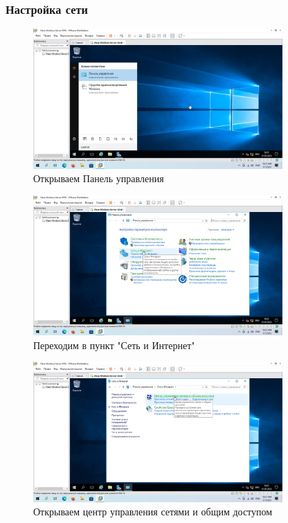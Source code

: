 \documentclass[a4paper]{article}
\begin{document}
  \subsubsection{Настройка сети}

  \begin{figure}[H]
    \centering
    \includegraphics[width=0.85\textwidth]{9_0014}
    \caption{Открываем Панель управления}
    \label{img:0014}
  \end{figure}

  \begin{figure}[H]
    \centering
    \includegraphics[width=0.85\textwidth]{9_0015}
    \caption{Переходим в пункт "Сеть и Интернет"}
    \label{img:0015}
  \end{figure}

  \begin{figure}[H]
    \centering
    \includegraphics[width=0.85\textwidth]{9_0016}
    \caption{Открываем центр управления сетями и общим доступом}
    \label{img:0016}
  \end{figure}
\end{document}
